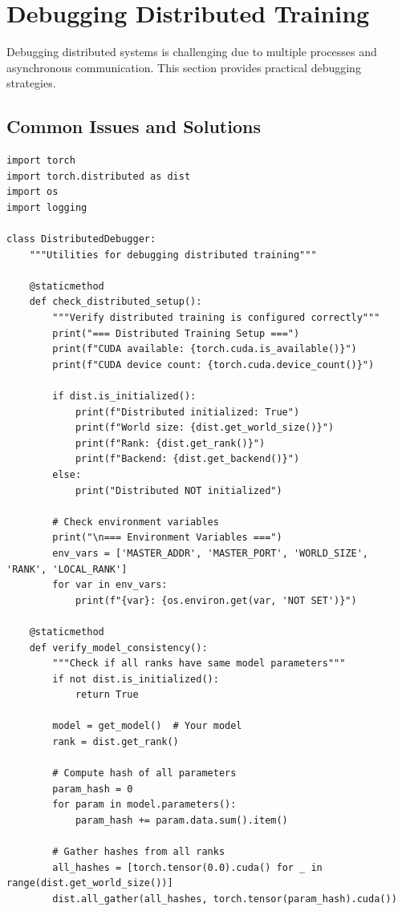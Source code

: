 \section{Debugging Distributed Training}

Debugging distributed systems is challenging due to multiple processes and asynchronous communication. This section provides practical debugging strategies.

\subsection{Common Issues and Solutions}

\begin{lstlisting}[style=python, caption=Debugging utilities for distributed training]
import torch
import torch.distributed as dist
import os
import logging

class DistributedDebugger:
    """Utilities for debugging distributed training"""

    @staticmethod
    def check_distributed_setup():
        """Verify distributed training is configured correctly"""
        print("=== Distributed Training Setup ===")
        print(f"CUDA available: {torch.cuda.is_available()}")
        print(f"CUDA device count: {torch.cuda.device_count()}")

        if dist.is_initialized():
            print(f"Distributed initialized: True")
            print(f"World size: {dist.get_world_size()}")
            print(f"Rank: {dist.get_rank()}")
            print(f"Backend: {dist.get_backend()}")
        else:
            print("Distributed NOT initialized")

        # Check environment variables
        print("\n=== Environment Variables ===")
        env_vars = ['MASTER_ADDR', 'MASTER_PORT', 'WORLD_SIZE', 'RANK', 'LOCAL_RANK']
        for var in env_vars:
            print(f"{var}: {os.environ.get(var, 'NOT SET')}")

    @staticmethod
    def verify_model_consistency():
        """Check if all ranks have same model parameters"""
        if not dist.is_initialized():
            return True

        model = get_model()  # Your model
        rank = dist.get_rank()

        # Compute hash of all parameters
        param_hash = 0
        for param in model.parameters():
            param_hash += param.data.sum().item()

        # Gather hashes from all ranks
        all_hashes = [torch.tensor(0.0).cuda() for _ in range(dist.get_world_size())]
        dist.all_gather(all_hashes, torch.tensor(param_hash).cuda())


\end{lstlisting}
